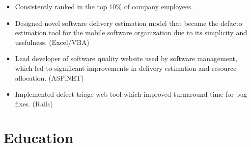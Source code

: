 \documentclass[11pt,a4paper,roman]{moderncv}
\begin{document}
\vspace{5mm}

\begin{itemize}
\item Consistently ranked in the top 10\% of company employees.
\item Designed novel software delivery estimation model that became the defacto estimation tool for the mobile software organization due to its simplicity and usefulness. (Excel/VBA)
\item Lead developer of software quality website used by software management, which led to significant improvements in delivery estimation and resource allocation. (ASP.NET)
\item Implemented defect triage web tool which improved turnaround time for bug fixes. (Rails)
\end{itemize}

\section{Education}
\end{document}
